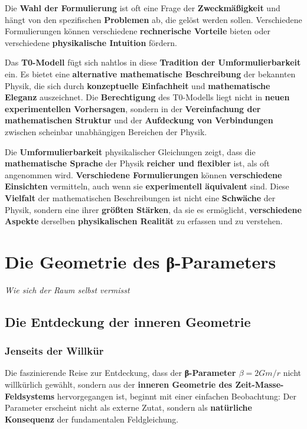 \documentclass[12pt,a4paper]{report}
\begin{document}
	Die \textbf{Wahl der Formulierung} ist oft eine Frage der \textbf{Zweckmäßigkeit} und hängt von den spezifischen \textbf{Problemen} ab, die gelöst werden sollen. Verschiedene Formulierungen können verschiedene \textbf{rechnerische Vorteile} bieten oder verschiedene \textbf{physikalische Intuition} fördern.
	
	Das \textbf{T0-Modell} fügt sich nahtlos in diese \textbf{Tradition der Umformulierbarkeit} ein. Es bietet eine \textbf{alternative mathematische Beschreibung} der bekannten Physik, die sich durch \textbf{konzeptuelle Einfachheit} und \textbf{mathematische Eleganz} auszeichnet. Die \textbf{Berechtigung} des T0-Modells liegt nicht in \textbf{neuen experimentellen Vorhersagen}, sondern in der \textbf{Vereinfachung der mathematischen Struktur} und der \textbf{Aufdeckung von Verbindungen} zwischen scheinbar unabhängigen Bereichen der Physik.
	
	Die \textbf{Umformulierbarkeit} physikalischer Gleichungen zeigt, dass die \textbf{mathematische Sprache} der Physik \textbf{reicher und flexibler} ist, als oft angenommen wird. \textbf{Verschiedene Formulierungen} können \textbf{verschiedene Einsichten} vermitteln, auch wenn sie \textbf{experimentell äquivalent} sind. Diese \textbf{Vielfalt} der mathematischen Beschreibungen ist nicht eine \textbf{Schwäche} der Physik, sondern eine ihrer \textbf{größten Stärken}, da sie es ermöglicht, \textbf{verschiedene Aspekte} derselben \textbf{physikalischen Realität} zu erfassen und zu verstehen.  
	\chapter{Die Geometrie des β-Parameters}
\textit{Wie sich der Raum selbst vermisst}

\section{Die Entdeckung der inneren Geometrie}

\subsection{Jenseits der Willkür}

Die faszinierende Reise zur Entdeckung, dass der \textbf{β-Parameter $\beta = 2Gm/r$} nicht willkürlich gewählt, sondern aus der \textbf{inneren Geometrie des Zeit-Masse-Feldsystems} hervorgegangen ist, beginnt mit einer einfachen Beobachtung: Der Parameter erscheint nicht als externe Zutat, sondern als \textbf{natürliche Konsequenz} der fundamentalen Feldgleichung.
\end{document}
